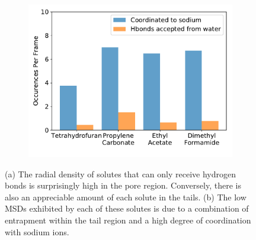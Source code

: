 \documentclass{article}
\begin{document}
\begin{figure}[!htb]
\begin{subfigure}{0.325\textwidth}
  \includegraphics[width=\textwidth]{nondonor_hbonds.pdf}
  \caption{}\label{fig:nondonors_hbonds}
  \end{subfigure}
  \caption{(a) The radial density of solutes that can only receive hydrogen bonds
  is surprisingly high in the pore region. Conversely, there is also an appreciable
  amount of each solute in the tails. (b) The low MSDs exhibited by each of these
  solutes is due to a combination of entrapment within the tail region and a high 
  degree of coordination with sodium ions.}\label{fig:nondonors}
  \end{figure}
  
  
\end{document}
